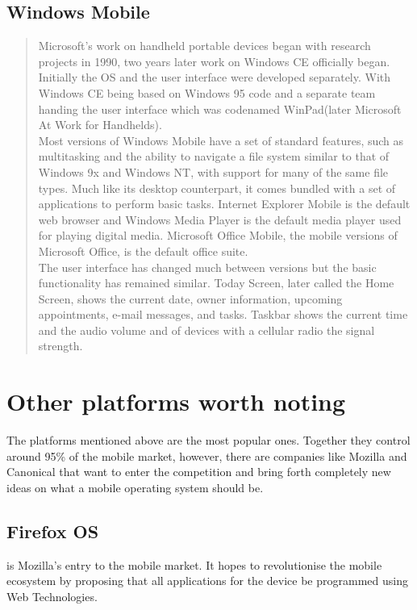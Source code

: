 \subsection{Windows Mobile}
\begin{quotation}
Microsoft's work on handheld portable devices began with research projects in 1990, two years later work on Windows CE officially began. Initially the OS and the user interface were developed separately. With Windows CE being based on Windows 95 code and a separate team handing the user interface which was codenamed WinPad(later Microsoft At Work for Handhelds).\\

Most versions of Windows Mobile have a set of standard features, such as multitasking and the ability to navigate a file system similar to that of Windows 9x and Windows NT, with support for many of the same file types. Much like its desktop counterpart, it comes bundled with a set of applications to perform basic tasks. Internet Explorer Mobile is the default web browser and Windows Media Player is the default media player used for playing digital media. Microsoft Office Mobile, the mobile versions of Microsoft Office, is the default office suite.\\

The user interface has changed much between versions but the basic functionality has remained similar. Today Screen, later called the Home Screen, shows the current date, owner information, upcoming appointments, e-mail messages, and tasks. Taskbar shows the current time and the audio volume and of devices with a cellular radio the signal strength.
\cite{wikipedia:windows}
\end{quotation}






\section{Other platforms worth noting}
The platforms mentioned above are the most popular ones. Together they control around 95\% of the mobile market, however, there are companies like Mozilla and Canonical that want to enter the competition and bring forth completely new ideas on what a mobile operating system should be.

\subsection{Firefox OS}
 is Mozilla's entry to the mobile market. It hopes to revolutionise the mobile ecosystem by proposing that all applications for the device be programmed using Web Technologies.

